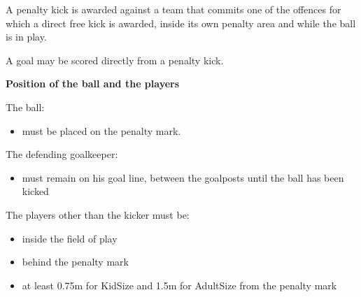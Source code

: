 \clearpage
\sffamily
{\bfseries \color[rgb]{0.4,0.4,0.4}{Law 14 -- The Penalty Kick}}
{}

\bigskip
A penalty kick is awarded against a team that commits one of the 
offences for which a direct free kick is awarded,
inside its own penalty area and while the ball is in play.

\bigskip

A goal may be scored directly from a penalty kick.

\bigskip


{\bfseries Position of the ball and the players }

\headlinebox

The ball:

\begin{itemize}
\item must be placed on the penalty mark.
\end{itemize}


The defending goalkeeper:

\begin{itemize}
\item must remain on his goal line, between the goalposts until the ball has been kicked 
\end{itemize}

The players other than the kicker must be:

\begin{itemize}
\item inside the field of play
\item behind the penalty mark
\item at least 0.75m for KidSize and 1.5m for AdultSize from the
      penalty mark 
\end{itemize}

